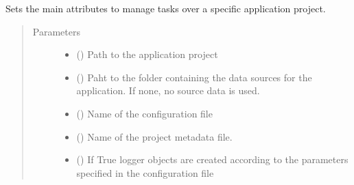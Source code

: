 \documentclass[letterpaper,10pt,english]{sphinxmanual}
\begin{document}
\begin{fulllineitems}
\begin{fulllineitems}
\label{\detokenize{dc_base_taskmanager:src.base_taskmanager.baseTaskManager.__init__}}
\sphinxAtStartPar
Sets the main attributes to manage tasks over a specific application
project.
\begin{quote}\begin{description}
\item[{Parameters}] \leavevmode\begin{itemize}
\item {} 
\sphinxAtStartPar
{} () \textendash{} Path to the application project

\item {} 
\sphinxAtStartPar
{} () \textendash{} Paht to the folder containing the data sources for the application.
If none, no source data is used.

\item {} 
\sphinxAtStartPar
{} () \textendash{} Name of the configuration file

\item {} 
\sphinxAtStartPar
{} () \textendash{} Name of the project metadata file.

\item {} 
\sphinxAtStartPar
{} () \textendash{} If True logger objects are created according to the parameters
specified in the configuration file

\end{itemize}

\end{description}\end{quote}


\end{fulllineitems}
\end{fulllineitems}
\end{document}

